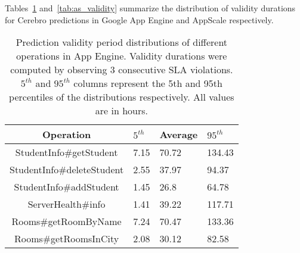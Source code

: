 

Tables~\ref{tab:gae_validity} and~\ref{tab:as_validity} summarize 
the distribution of validity 
durations for Cerebro predictions in Google App Engine and AppScale
respectively.
\begin{table}[htdp]
\caption{Prediction validity period distributions of different operations in
App Engine. Validity durations were computed by observing $3$ consecutive SLA
violations. $5^{th}$ and $95^{th}$ columns represent the 5th and 95th 
percentiles of the
distributions respectively. All values are in hours.}
\begin{center}
\begin{tabular}{|c|p{1cm}|p{1cm}|p{1cm}|}
\hline
Operation & $5^{th}$ & Average & $95^{th}$ \\ \hline
StudentInfo\#getStudent & 7.15 & 70.72 & 134.43 \\ \hline
StudentInfo\#deleteStudent & 2.55 & 37.97 & 94.37 \\ \hline
StudentInfo\#addStudent & 1.45 & 26.8 & 64.78 \\ \hline
ServerHealth\#info & 1.41 & 39.22 & 117.71 \\ \hline
Rooms\#getRoomByName & 7.24 & 70.47 & 133.36 \\ \hline
Rooms\#getRoomsInCity & 2.08 & 30.12 & 82.58 \\ \hline
\end{tabular}
\end{center}
\label{tab:gae_validity}
\end{table}

